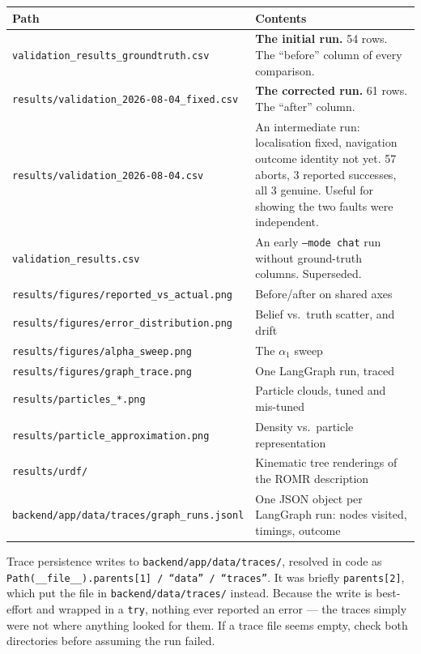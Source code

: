 \documentclass[11pt,a4paper]{report}
\newcommand{\file}[1]{\texttt{\small #1}}
\begin{document}
\begin{center}
\small
\begin{tabular}{@{}p{}p{}@{}}
\toprule
\textbf{Path} & \textbf{Contents} \\
\midrule
\file{validation\_results\_groundtruth.csv} &
  \textbf{The initial run.} 54 rows. The ``before'' column of every comparison. \\
\file{results/validation\_2026-08-04\_fixed.csv} &
  \textbf{The corrected run.} 61 rows. The ``after'' column. \\
\file{results/validation\_2026-08-04.csv} &
  An intermediate run: localisation fixed, navigation outcome identity not yet.
  57 aborts, 3 reported successes, all 3 genuine. Useful for showing the two
  faults were independent. \\
\file{validation\_results.csv} &
  An early \file{--mode chat} run without ground-truth columns. Superseded. \\
\midrule
\file{results/figures/reported\_vs\_actual.png} & Before/after on shared axes \\
\file{results/figures/error\_distribution.png} & Belief vs.\ truth scatter, and drift \\
\file{results/figures/alpha\_sweep.png} & The $\alpha_1$ sweep \\
\file{results/figures/graph\_trace.png} & One LangGraph run, traced \\
\file{results/particles\_*.png} & Particle clouds, tuned and mis-tuned \\
\file{results/particle\_approximation.png} & Density vs.\ particle representation \\
\file{results/urdf/} & Kinematic tree renderings of the ROMR description \\
\midrule
\file{backend/app/data/traces/graph\_runs.jsonl} &
  One JSON object per LangGraph run: nodes visited, timings, outcome \\
\bottomrule
\end{tabular}
\end{center}

\begin{warnbox}
Trace persistence writes to \file{backend/app/data/traces/}, resolved in code
as \file{Path(\_\_file\_\_).parents[1] / ``data'' / ``traces''}. It was briefly
\file{parents[2]}, which put the file in \file{backend/data/traces/} instead.
Because the write is best-effort and wrapped in a \file{try}, nothing ever
reported an error --- the traces simply were not where anything looked for
them. If a trace file seems empty, check both directories before assuming the
run failed.
\end{warnbox}
\end{document}
